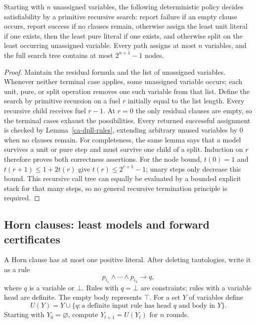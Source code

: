 \begin{theorem}\label{ca-dpll}
Starting with $n$ unassigned variables, the following deterministic policy
decides satisfiability by a primitive recursive search: report failure if an
empty clause occurs, report success if no clauses remain, otherwise assign
the least unit literal if one exists, then the least pure literal if one
exists, and otherwise split on the least occurring unassigned variable.
Every path assigns at most $n$ variables, and the full search tree contains
at most $2^{n+1}-1$ nodes.
\end{theorem}
\begin{proof}
Maintain the residual formula and the list of unassigned variables.
Whenever neither terminal case applies, some unassigned variable occurs;
each unit, pure, or split operation removes one such variable from that
list.  Define the search by primitive recursion on a fuel $r$ initially
equal to the list length.  Every recursive child receives fuel $r-1$.
At $r=0$ the only residual clauses are empty, so the terminal cases exhaust
the possibilities.  Every returned successful assignment is checked by
Lemma~\ref{ca-dpll-rules}, extending arbitrary unused variables by $0$ when
no clauses remain.  For completeness, the same lemma says that a model
survives a unit or pure step and must survive one child of a split.  Induction
on $r$ therefore proves both correctness assertions.  For the node bound,
$t(0)=1$ and $t(r+1)\leq1+2t(r)$ give $t(r)\leq2^{r+1}-1$;
unary steps only decrease this bound.  This recursive call tree can equally
be evaluated by a bounded explicit stack for that many steps, so no
general recursive termination principle is required.
\end{proof}

\subsection{Horn clauses: least models and forward certificates}

A Horn clause has at most one positive literal.  After deleting tautologies,
write it as a rule
\[
  p_{i_1}\wedge\cdots\wedge p_{i_k}\longrightarrow q,
\]
where $q$ is a variable or $\bot$.  Rules with $q=\bot$ are constraints;
rules with a variable head are definite.  The empty body represents $\top$.
For a set $Y$ of variables define
\[
 U(Y)=Y\cup\{q:\text{a definite input rule has head $q$ and body in $Y$}\}.
\]
Starting with $Y_0=\varnothing$, compute $Y_{t+1}=U(Y_t)$ for $n$ rounds.

